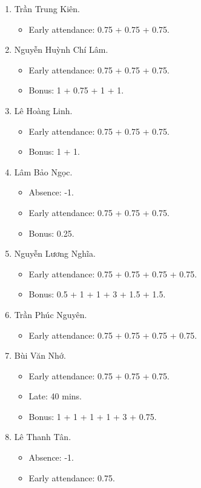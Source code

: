 \documentclass{article}
\begin{document}
\begin{enumerate}
	\item {\sc Trần Trung Kiên.}
	\begin{itemize}
		\item Early attendance: 0.75 + 0.75 + 0.75.
	\end{itemize}
	\item {\sc Nguyễn Huỳnh Chí Lâm.}
	\begin{itemize}
		\item Early attendance: 0.75 + 0.75 + 0.75.
		\item Bonus: 1 + 0.75 + 1 + 1.
	\end{itemize}
	\item {\sc Lê Hoàng Linh.}
	\begin{itemize}
		\item Early attendance: 0.75 + 0.75 + 0.75.
		\item Bonus: 1 + 1.
	\end{itemize}
	\item {\sc Lâm Bảo Ngọc.}
	\begin{itemize}
		\item Absence: -1.
		\item Early attendance: 0.75 + 0.75 + 0.75.
		\item Bonus: 0.25.
	\end{itemize}
	\item {\sc Nguyễn Lương Nghĩa.}
	\begin{itemize}
		\item Early attendance: 0.75 + 0.75 + 0.75 + 0.75.
		\item Bonus: 0.5 + 1 + 1 + 3 + 1.5 + 1.5.
	\end{itemize}
	\item {\sc Trần Phúc Nguyên.}
	\begin{itemize}
		\item Early attendance: 0.75 + 0.75 + 0.75 + 0.75.
	\end{itemize}
	\item {\sc Bùi Văn Nhớ}.
	\begin{itemize}
		\item Early attendance: 0.75 + 0.75 + 0.75.
		\item Late: 40 mins.
		\item Bonus: 1 + 1 + 1 + 1 + 3 + 0.75.	
	\end{itemize}
	\item {\sc Lê Thanh Tân.}
	\begin{itemize}
		\item Absence: -1.
		\item Early attendance: 0.75.

\end{itemize}
\end{enumerate}
\end{document}
